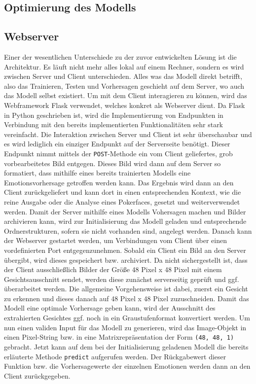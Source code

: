 \documentclass[12pt, a4paper]{report}
\begin{document}
\subsection{Optimierung des Modells}

\subsection{Webserver}
Einer der wesentlichen Unterschiede zu der zuvor entwickelten Lösung ist die Architektur. Es läuft nicht mehr alles lokal auf einem Rechner, sondern es wird zwischen Server und Client unterschieden. Alles was das Modell direkt betrifft, also das Trainieren, Testen und Vorhersagen geschieht auf dem Server, wo auch das Modell selbst existiert. Um mit dem Client interagieren zu können, wird das Webframework Flask verwendet, welches konkret als Webserver dient. Da Flask in Python geschrieben ist, wird die Implementierung von Endpunkten in Verbindung mit den bereits implementierten Funktionalitäten sehr stark vereinfacht.\newline
Die Interaktion zwischen Server und Client ist sehr überschaubar und es wird lediglich ein einziger Endpunkt auf der Serverseite benötigt. Dieser Endpunkt nimmt mittels der \texttt{POST}-Methode ein vom Client geliefertes, grob vorbearbeitetes Bild entgegen. Dieses Bild wird dann auf dem Server so formatiert, dass mithilfe eines bereits trainierten Modells eine Emotionsvorhersage getroffen werden kann. Das Ergebnis wird dann an den Client zurückgeliefert und kann dort in einen entsprechenden Kontext, wie die reine Ausgabe oder die Analyse eines Pokerfaces, gesetzt und weiterverwendet werden.\newline
Damit der Server mithilfe eines Modells Vohersagen machen und Bilder archivieren kann, wird zur Initialisierung das Modell geladen und entsprechende Ordnerstrukturen, sofern sie nicht vorhanden sind, angelegt werden. Danach kann der Webserver gestartet werden, um Verbindungen vom Client über einen vordefinierten Port entgegenzunehmen. Sobald ein Client ein Bild an den Server übergibt, wird dieses gespeichert bzw. archiviert. Da nicht sichergestellt ist, dass der Client ausschließlich Bilder der Größe 48 Pixel x 48 Pixel mit einem Gesichtsausschnitt  sendet, werden diese zunächst serverseitig geprüft und ggf. überarbeitet werden.  
Die allgemeine Vorgehensweise ist dabei, zuerst ein Gesicht zu erkennen und dieses danach auf 48 Pixel x 48 Pixel zuzuschneiden. Damit das Modell eine optimale Vorhersage geben kann, wird der Ausschnitt des extrahierten Gesichtes ggf. noch in ein Graustufenformat konvertiert werden. Um nun einen validen Input für das Modell zu generieren, wird das Image-Objekt in einen Pixel-String bzw. in eine Matrixrepräsentation der Form \texttt{(48, 48, 1)} gebracht. Jetzt kann auf dem bei der Initialisierung geladenen Modell die bereits erläuterte Methode \texttt{predict} aufgerufen werden. Der Rückgabewert dieser Funktion bzw. die Vorhersagewerte der einzelnen Emotionen werden dann an den Client zurückgegeben.
\end{document}
